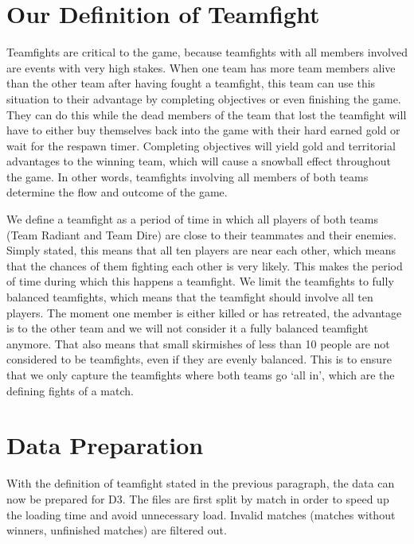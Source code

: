 \documentclass[11pt,twoside,a4paper]{article}
\begin{document}
\section{Our Definition of Teamfight}
Teamfights are critical to the game, because teamfights with all members involved are events with very high stakes. When one team has more team members alive than the other team after having fought a teamfight, this team can use this situation to their advantage by completing objectives or even finishing the game. They can do this while the dead members of the team that lost the teamfight will have to either buy themselves back into the game with their hard earned gold or wait for the respawn timer. Completing objectives will yield gold and territorial advantages to the winning team, which will cause a snowball effect throughout the game. In other words, teamfights involving all members of both teams determine the flow and outcome of the game.

We define a teamfight as a period of time in which all players of both teams (Team Radiant and Team Dire) are close to their teammates and their enemies. Simply stated, this means that all ten players are near each other, which means that the chances of them fighting each other is very likely. This makes the period of time during which this happens a teamfight. We limit the teamfights to fully balanced teamfights, which means that the teamfight should involve all ten players. The moment one member is either killed or has retreated, the advantage is to the other team and we will not consider it a fully balanced teamfight anymore. That also means that small skirmishes of less than 10 people are not considered to be teamfights, even if they are evenly balanced. This is to ensure that we only capture the teamfights where both teams go `all in', which are the defining fights of a match.

\section{Data Preparation}
With the definition of teamfight stated in the previous paragraph, the data can now be prepared for D3. The files are first split by match in order to speed up the loading time and avoid unnecessary load. Invalid matches (matches without winners, unfinished matches) are filtered out. 
\end{document}
